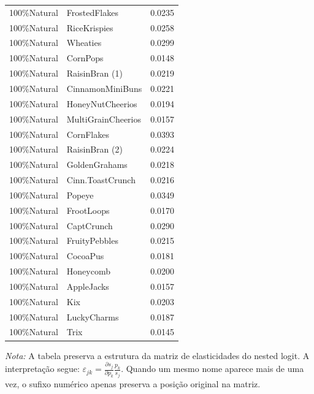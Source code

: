 \begin{table}[H]
\begin{tabular}{llr}
100\%Natural & FrostedFlakes & 0.0235 \\
100\%Natural & RiceKrispies & 0.0258 \\
100\%Natural & Wheaties & 0.0299 \\
100\%Natural & CornPops & 0.0148 \\
100\%Natural & RaisinBran (1) & 0.0219 \\
100\%Natural & CinnamonMiniBuns & 0.0221 \\
100\%Natural & HoneyNutCheerios & 0.0194 \\
100\%Natural & MultiGrainCheerios & 0.0157 \\
100\%Natural & CornFlakes & 0.0393 \\
100\%Natural & RaisinBran (2) & 0.0224 \\
100\%Natural & GoldenGrahams & 0.0218 \\
100\%Natural & Cinn.ToastCrunch & 0.0216 \\
100\%Natural & Popeye & 0.0349 \\
100\%Natural & FrootLoops & 0.0170 \\
100\%Natural & CaptCrunch & 0.0290 \\
100\%Natural & FruityPebbles & 0.0215 \\
100\%Natural & CocoaPus & 0.0181 \\
100\%Natural & Honeycomb & 0.0200 \\
100\%Natural & AppleJacks & 0.0157 \\
100\%Natural & Kix & 0.0203 \\
100\%Natural & LuckyCharms & 0.0187 \\
100\%Natural & Trix & 0.0145 \\
\bottomrule
\end{tabular}

\vspace{0.3em}
\footnotesize
\textit{Nota:} A tabela preserva a estrutura da matriz de elasticidades do nested logit. A interpretação segue: $\varepsilon_{jk}=\frac{\partial s_j}{\partial p_k}\frac{p_k}{s_j}$. Quando um mesmo nome aparece mais de uma vez, o sufixo numérico apenas preserva a posição original na matriz.
\end{table}
\endgroup


